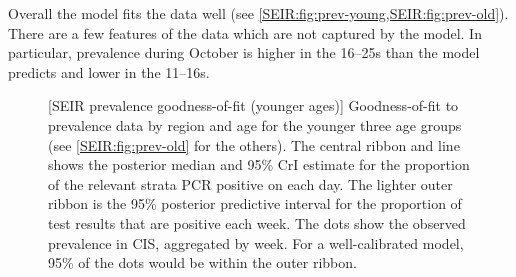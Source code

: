 \documentclass[thesis.tex]{subfiles}
\begin{document}
Overall the model fits the data well (see \cref{SEIR:fig:prev-young,SEIR:fig:prev-old}).
There are a few features of the data which are not captured by the model.
In particular, prevalence during October is higher in the 16--25s than the model predicts and lower in the 11--16s.
\begin{figure}
    \vspace{-3cm}
    \captionsetup{width=0.8\paperwidth}
    [SEIR prevalence goodness-of-fit (younger ages)]{%
        Goodness-of-fit to prevalence data by region and age for the younger three age groups (see \cref{SEIR:fig:prev-old} for the others).
        The central ribbon and line shows the posterior median and 95\% CrI estimate for the proportion of the relevant strata PCR positive on each day.
        The lighter outer ribbon is the 95\% posterior predictive interval for the proportion of test results that are positive each week.
        The dots show the observed prevalence in CIS, aggregated by week.
        For a well-calibrated model, 95\% of the dots would be within the outer ribbon.
    }
    \label{SEIR:fig:prev-young}
\end{figure}
\end{document}
